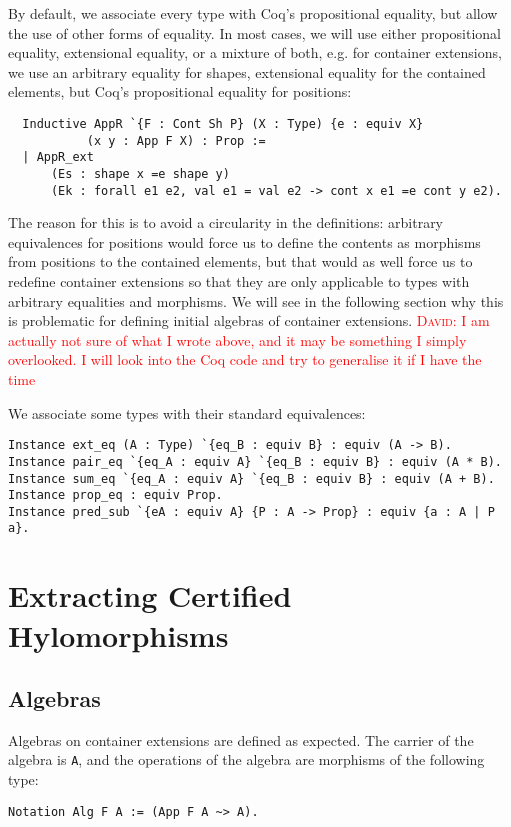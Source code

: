 \documentclass[a4paper, UKenglish, cleveref, autoref, thm-restate]{lipics-v2021}
\newcommand{\dcas}[1]{\textcolor{red}{\textsc{David}: #1}}
\begin{document}
By default, we associate every type with Coq's propositional equality, but allow
the use of other forms of equality. In most cases, we will use either
propositional equality, extensional equality, or a mixture of both, e.g. for
container extensions, we use an arbitrary equality for shapes, extensional
equality for the contained elements, but Coq's propositional equality for
positions:

\begin{verbatim}
  Inductive AppR `{F : Cont Sh P} (X : Type) {e : equiv X}
           (x y : App F X) : Prop :=
  | AppR_ext
      (Es : shape x =e shape y)
      (Ek : forall e1 e2, val e1 = val e2 -> cont x e1 =e cont y e2).
\end{verbatim}
The reason for this is to avoid a circularity in the definitions: arbitrary
equivalences for positions would force us to define the contents as morphisms
from positions to the contained elements, but that would as well force us to
redefine container extensions so that they are only applicable to types with
arbitrary equalities and morphisms.  We will see in the following section why
this is problematic for defining initial algebras of container extensions.
\dcas{I am actually not sure of what I wrote above, and it may be something I
simply overlooked. I will look into the Coq code and try to generalise it if I
have the time}

We associate some types with their standard equivalences:
\begin{verbatim}
Instance ext_eq (A : Type) `{eq_B : equiv B} : equiv (A -> B).
Instance pair_eq `{eq_A : equiv A} `{eq_B : equiv B} : equiv (A * B).
Instance sum_eq `{eq_A : equiv A} `{eq_B : equiv B} : equiv (A + B).
Instance prop_eq : equiv Prop.
Instance pred_sub `{eA : equiv A} {P : A -> Prop} : equiv {a : A | P a}.
\end{verbatim}

\section{Extracting Certified Hylomorphisms}

\subsection{Algebras}

Algebras on container extensions are defined as expected. The carrier of the
algebra is \texttt{A}, and the operations of the algebra are
morphisms of the following type:
\begin{verbatim}
Notation Alg F A := (App F A ~> A).
\end{verbatim}
\end{document}

